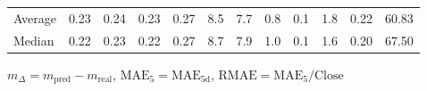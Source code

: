 \begin{threeparttable}
{\begin{tabular}{lrrrrrrrrrrr}
Average &          0.23 &          0.24 &          0.23 &        0.27 &                 8.5 &                 7.7 &        0.8 &                 0.1 &              1.8 &            0.22 &                  60.83 \\
 Median &          0.22 &          0.23 &          0.22 &        0.27 &                 8.7 &                 7.9 &        1.0 &                 0.1 &              1.6 &            0.20 &                  67.50 \\
\bottomrule
\end{tabular}
}
\begin{tablenotes}\footnotesize
\item $m_\Delta=m_{\text{pred}}-m_{\text{real}}$,
$\mathrm{MAE}_5=\mathrm{MAE}_{5\text{d}}$,
$\mathrm{RMAE}=\mathrm{MAE}_5/\text{Close}$
\end{tablenotes}
\end{threeparttable}
\endgroup

